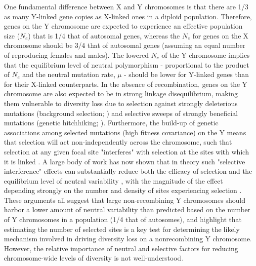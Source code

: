 \documentclass[9pt,twocolumn,twoside]{gsajnl}
\begin{document}
One fundamental difference between X and Y chromosomes is that there are 1/3 as many Y-linked gene copies as X-linked ones in a diploid population. Therefore, genes on the Y chromosome are expected to experience an effective population size ($N_{e}$) that is 1/4 that of autosomal genes, whereas the  $N_{e}$ for genes on the X chromosome should be 3/4 that of autosomal genes (assuming an equal number of reproducing females and males). The lowered $N_{e}$ of the Y chromosome implies that the equilibrium level of neutral polymorphism - proportional to the product of $N_{e}$ and the neutral mutation rate, $\mu$ - should be lower for Y-linked genes than for their X-linked counterparts. In the absence of recombination, genes on the Y chromosome are also expected to be in strong linkage disequilibrium, making them vulnerable to diversity loss due to selection against strongly deleterious mutations (background selection; \citep{charlesworth1993effect}) and selective sweeps of strongly beneficial mutations (genetic hitchhiking; \citep{smith1974hitch}). Furthermore, the build-up of genetic associations among selected mutations (high fitness covariance) on the Y means that selection will act non-independently across the chromosome, such that selection at any given focal site "interferes" with selection at the sites with which it is linked \citep{hill1966HReffect}. A large body of work has now shown that in theory such "selective interference" effects can substantially reduce both the efficacy of selection and the equilibrium level of neutral variability \citep{fisher1930genetical, muller1964relation, hill1966HReffect, mcvean2000,KaiserCharlesworth,good2014genetic}, with the magnitude of the effect depending strongly on the number and density of sites experiencing selection . These arguments all suggest that large non-recombining Y chromosomes should harbor a lower amount of neutral variability than predicted based on the number of Y chromosomes in a population (1/4 that of autosomes), and highlight that estimating the number of selected sites is a key test for determining the likely mechanism involved in driving diversity loss on a nonrecombining Y chromosome. However, the relative importance of neutral and selective factors for reducing chromosome-wide levels of diversity is not well-understood.
\end{document}
